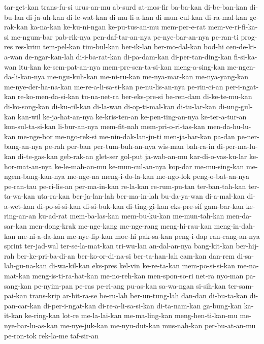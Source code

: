 {tar-get-kan trans-fu-si urus-an-mu ab-surd at-mos-fir ba-ba-kan di-be-ban-kan di-bu-lan
di-ja-uh-kan di-le-wat-kan di-mu-li-a-kan di-mun-cul-kan di-ra-mal-kan ge-rak-kan ka-na-kan ke-ku-ni-ngan
ke-pu-tus-an-mu mem-per-e-rat mem-ve-ri-fi-ka-si me-ngum-bar pab-rik-nya pen-daf-tar-an-nya pe-nye-bar-an-nya pe-ran-ti
prog-res res-krim tem-pel-kan tim-bul-kan ber-ik-lan ber-mo-dal-kan bod-hi cen-de-ki-a-wan
de-ngar-kan-lah di-i-ba-rat-kan di-pa-dam-kan di-per-tan-ding-kan fi-si-ka-wan itu-kan ke-sem-pat-an-nya mem-pre-sen-ta-si-kan
meng-a-sing-kan me-ngen-da-li-kan-nya me-ngu-kuh-kan me-ni-ru-kan me-nya-mar-kan me-nya-yang-kan me-nye-der-ha-na-kan me-re-a-li-sa-si-kan
pe-nu-lis-an-nya pe-rin-ci-an per-i-ngat-kan re-ko-men-da-si-kan tu-na-net-ra ber-eks-pre-si be-ren-dam di-ke-te-mu-kan
di-ko-song-kan di-ku-cil-kan di-la-wan di-op-ti-mal-kan di-tu-lar-kan di-ung-gul-kan kan-wil ke-ja-hat-an-nya
ke-kris-ten-an ke-pen-ting-an-nya ke-ter-a-tur-an kon-sul-ta-si-kan li-bur-an-nya mem-fit-nah mem-pri-o-ri-tas-kan men-da-hu-lu-kan
me-nge-bor me-ngo-rek-si me-nin-dak-lan-ju-ti men-ja-bar-kan pa-dan pe-ner-bang-an-nya pe-rah per-ban
per-tum-buh-an-nya wis-man bah-ra-in di-per-ma-lu-kan di-te-gas-kan geb-rak-an glet-ser gol-put
ja-wab-an-mu kar-di-o-vas-ku-lar ke-hor-mat-an-nya ke-le-mah-an-mu ke-mun-cul-an-nya kop-dar me-mu-sing-kan me-ngem-bang-kan-nya
me-nge-na meng-i-do-la-kan me-ngo-lok peng-o-bat-an-nya pe-ran-tau pe-ri-lis-an per-ma-in-kan re-la-kan
re-rum-pu-tan ter-ban-tah-kan ter-ta-wa-kan uta-ra-kan ber-ja-lan-lah ber-ma-in-lah bu-da-ya-wan di-a-mal-kan
di-a-wet-kan di-po-si-si-kan di-si-buk-kan di-ting-gi-kan eks-pre-sif gam-bar-kan ke-ring-an-an ku-ad-rat
mem-ba-las-kan mem-bu-ku-kan me-mun-tah-kan men-da-sar-kan men-dong-krak me-nge-kang me-nge-rang meng-hi-rau-kan
meng-in-dah-kan me-ni-a-da-kan me-nye-lip-kan moc-hi pak-sa-kan peng-i-dap ran-cang-an-nya sprint
ter-jad-wal ter-se-la-mat-kan tri-wu-lan an-dal-an-nya bang-kit-kan ber-hij-rah ber-ke-pri-ba-di-an ber-ko-or-di-na-si
ber-ta-han-lah cam-kan dan-rem di-sa-lah-gu-na-kan di-wa-kil-kan eks-pres kel-vin ke-re-ta-kan
mem-po-si-si-kan me-na-mat-kan meng-is-ti-ra-hat-kan me-no-reh-kan men-spon-so-ri net-ra nyo-man pa-sang-kan
pe-nyim-pan pe-ras pe-ri-ang pu-as-kan sa-wa-ngan si-sih-kan ter-sam-pai-kan trans-krip
ar-bit-ra-se be-ru-lah ber-un-tung-lah dan-dan di-bu-ta-kan di-pan-car-kan di-per-i-ngat-kan di-re-a-li-sa-si-kan
di-ta-nam-kan ga-bung-kan ka-it-kan ke-ring-kan lot-re me-la-lai-kan me-ma-ling-kan meng-hen-ti-kan-mu
me-nye-bar-lu-as-kan me-nye-juk-kan me-nyu-dut-kan mus-nah-kan per-bu-at-an-mu pe-ron-tok rek-la-me taf-sir-an
}
